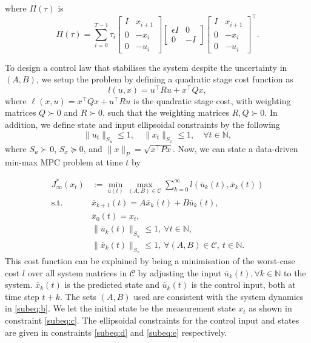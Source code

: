 where $\Pi(\tau)$ is
\begin{equation}
	\label{eq:PI}
	\Pi(\tau) = \sum_{i=0}^{T-1} \tau_i
	\begin{bmatrix}
		I & x_{i+1} \\
		0 & -x_i \\
		0 & -u_i
	\end{bmatrix}
	\begin{bmatrix}
		\epsilon I & 0 \\
		0 & -I
	\end{bmatrix}
	\begin{bmatrix}
		I & x_{i+1} \\
		0 & -x_i \\
		0 & -u_i
	\end{bmatrix}^{\top}.
\end{equation}

To design a control law that stabilises the system despite the uncertainty in \((A, B)\), we setup the problem by defining a quadratic stage cost function as
\[
l(u, x) = u^\top R u + x^\top Q x,
\]
where \(\ell(x, u) = x^\top Q x + u^\top R u\) is the quadratic stage cost, with weighting matrices \(Q \succ 0\) and \(R \succ 0\).
such that the weighting matrices $R, Q \succ 0$.
In addition, we define state and input ellipsoidal constraints by the following
\[
\|u_t\|_{S_u} \leq 1, \quad \|x_t\|_{S_x} \leq 1, \quad \forall t \in \mathbb{N},
\]
where $S_u \succ 0$, $S_x \succeq 0$, and $\|x\|_P = \sqrt{x^\top P x}$.
Now, we can state a data-driven min-max MPC problem at time $t$ by

\begin{subequations} \label{eq:main_problem}
	\begin{align}
		J_\infty^*(x_t) &:= \min_{\bar{u}(t)} \max_{(A, B) \in \mathcal{C}} \sum_{k=0}^{\infty} l\left(\bar{u}_k(t), \bar{x}_k(t)\right) \\
		\text{s.t.} \quad & \bar{x}_{k+1}(t) = A \bar{x}_k(t) + B \bar{u}_k(t), \label{subeq:b}\\
		& \bar{x}_0(t) = x_t, \label{subeq:c}\\
		& \|\bar{u}_k(t)\|_{S_u} \leq 1, \ \forall t \in \mathbb{N}, \label{subeq:d}\\
		& \|\bar{x}_k(t)\|_{S_x} \leq 1, \ \forall \left(A, B\right) \in \mathcal{C}, \ t \in \mathbb{N} \label{subeq:e}.
	\end{align}
\end{subequations}
%
This cost function can be explained by being a minimisation of the worst-case cost $l$ over all system matrices in $\mathcal{C}$ by adjusting the input $\bar{u}_k(t), \forall k \in \mathbb{N}$ to the system. $\bar{x}_k(t)$ is the predicted state and $\bar{u}_k(t)$ is the control input, both at time step $t+k$.
The sets $(A,B)$ used are consistent with the system dynamics in \eqref{subeq:b}. We let the initial state be the measurement state $x_t$ as shown in constraint \eqref{subeq:c}.
The ellipsoidal constraints for the control input and states are given in constraints \eqref{subeq:d} and \eqref{subeq:e} respectively.

